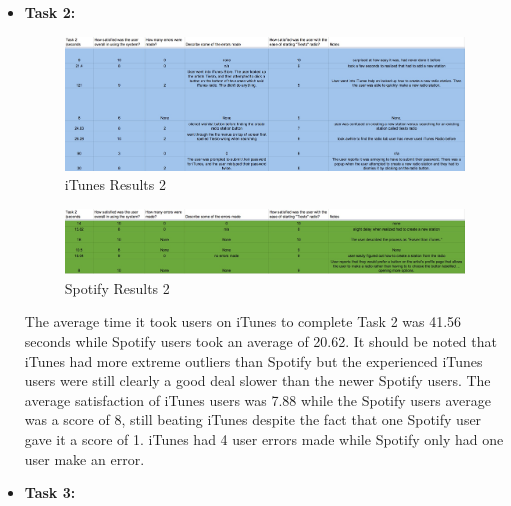 \documentclass[a4paper]{article}
\begin{document}
\begin{itemize}
      \item \textbf{Task 2:}
      
          \begin{figure}[H]
              \centering
              \includegraphics[width=1\textwidth]{itunestask2_copy.jpg}
              \caption{\label{tasks: task2itunes}iTunes Results 2}
          \end{figure}
          \begin{figure}[H]
              \centering
              \includegraphics[width=1\textwidth]{spotifytask2_copy.jpg}
              \caption{\label{tasks: task2spotify}Spotify Results 2}
          \end{figure}
          
      The average time it took users on iTunes to complete Task 2 was 41.56 seconds while Spotify users took an average of 20.62. It should be noted that iTunes had more extreme outliers than Spotify but the experienced iTunes users were still clearly a good deal slower than the newer Spotify users. The average satisfaction of iTunes users was 7.88 while the Spotify users average was a score of 8, still beating iTunes despite the fact that one Spotify user gave it a score of 1. iTunes had 4 user errors made while Spotify only had one user make an error.  \\
      
      
      \item \textbf{Task 3:}
     

\end{itemize}
\end{document}
